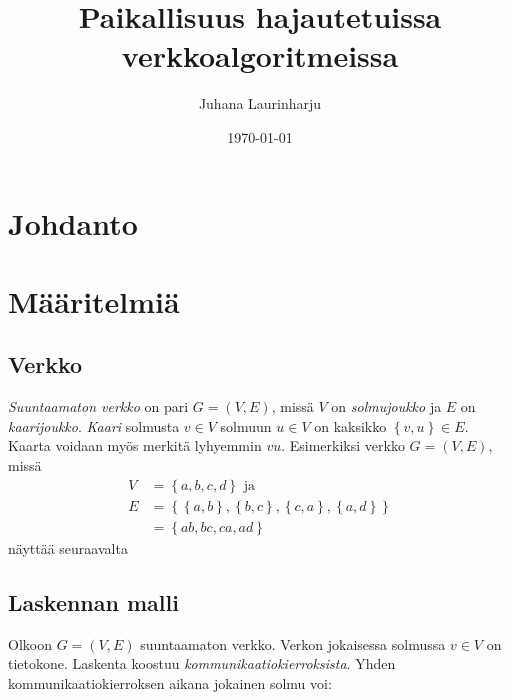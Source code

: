 \documentclass[finnish]{tktltiki2}
\title{Paikallisuus hajautetuissa verkkoalgoritmeissa}
\author{Juhana Laurinharju}
\date{\today}
\theoremstyle{definition}
\theoremstyle{remark}
\newcommand{\set}[1]{\left\{ #1 \right\}}
\begin{document}

\maketitle        %

\newpage          %



\section{Johdanto}

\section{Määritelmiä}

\subsection{Verkko}

\emph{Suuntaamaton verkko} on pari $G = (V,E)$, missä $V$ on \emph{solmujoukko}
ja $E$ on \emph{kaarijoukko}. \emph{Kaari} solmusta $v \in V$ solmuun $u \in V$
on kaksikko $\set{v,u} \in E$. Kaarta voidaan myös merkitä lyhyemmin $vu$.
Esimerkiksi verkko $G = (V,E)$, missä
%
\begin{align*}
    V &= \set{a,b,c,d} \text{ ja}\\
    E &= \set{ \set{a,b}, \set{b,c}, \set{c,a}, \set{a,d}} \\
      &= \set{ab, bc, ca, ad}
\end{align*}
%
näyttää seuraavalta
%
\begin{center}
\end{center}

\subsection{Laskennan malli}

Olkoon $G = (V,E)$ suuntaamaton verkko. Verkon jokaisessa solmussa $v \in V$ on
tietokone. Laskenta koostuu \emph{kommunikaatiokierroksista}. Yhden
kommunikaatiokierroksen aikana jokainen solmu voi:
\end{document}
